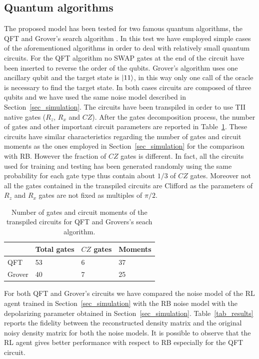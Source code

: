 \documentclass[referee,sn-basic]{sn-jnl} %
\begin{document}
\subsection{Quantum algorithms}
The proposed model has been tested for two famous quantum algorithms, the QFT \cite{Shor_1997} and Grover's search algorithm \cite{grover1996fast}. In this test we have employed simple cases of the aforementioned algorithms in order to deal with relatively small quantum circuits. For the QFT algorithm no SWAP gates at the end of the circuit have been inserted to reverse the order of the qubits. Grover's algorithm uses one ancillary qubit and the target state is $\ket{11}$, in this way only one call of the oracle is necessary to find the target state. In both cases circuits are composed of three qubits and we have used the same noise model described in Section~\ref{sec_simulation}. The circuits have been transpiled in order to use TII native gates ($R_z$, $R_x$ and $CZ$). After the gates decomposition process, the number of gates and other important circuit parameters are reported in Table~\ref{tab_gates}.
These circuits have similar characteristics regarding the number of gates and circuit moments as the ones employed in Section~\ref{sec_simulation} for the comparison with RB. However the fraction of $CZ$ gates is different. In fact, all the circuits used for training and testing has been generated randomly using the same probability for each gate type thus contain about $1/3$ of $CZ$ gates. Moreover not all the gates contained in the transpiled circuits are Clifford as the parameters of $R_z$ and $R_x$ gates are not fixed as multiples of $\pi/2$.

\begin{table}[ht]
\centering
\caption{Number of gates and circuit moments of the transpiled circuits for QFT and Grovers's seach algorithm.}
\label{tab_gates}
\begin{tabular}{@{}llll@{}}
\toprule
& Total gates & $CZ$ gates & Moments \\
\midrule
QFT & 53 & 6 & 37 \\
Grover & 40 & 7 & 25 \\
\bottomrule
\end{tabular}
\end{table}

\noindent
For both QFT and Grover's circuits we have compared the noise model of the RL agent trained in Section~\ref{sec_simulation} with the RB noise model with the depolarizing parameter obtained in Section~\ref{sec_simulation}. 
Table~\ref{tab_results} reports the fidelity between the reconstructed density matrix and the original noisy density matrix for both the noise models. It is possible to observe that the RL agent gives better performance with respect to RB especially for the QFT circuit. \\
\end{document}
